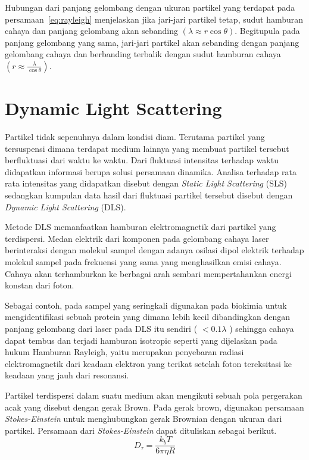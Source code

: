 Hubungan dari panjang gelombang dengan ukuran partikel yang terdapat pada 
persamaan~\ref{eq:rayleigh} menjelaskan jika jari-jari partikel tetap, sudut hamburan
cahaya dan panjang gelombang akan sebanding ${\left(\lambda \approx r \cos \theta \right)}$.
Begitupula pada panjang gelombang yang sama, jari-jari partikel akan sebanding dengan
panjang gelombang cahaya dan berbanding terbalik dengan sudut hamburan cahaya 
${\left(r \approx \frac{\lambda}{\cos \theta} \right)}$.



\section{Dynamic Light Scattering}
Partikel tidak sepenuhnya dalam kondisi diam. Terutama partikel yang tersuspensi dimana terdapat
medium lainnya yang membuat partikel tersebut berfluktuasi dari waktu ke waktu. Dari fluktuasi
intensitas terhadap waktu didapatkan informasi berupa solusi persamaan dinamika. Analisa terhadap
rata rata intensitas yang didapatkan disebut dengan \textit{Static Light Scattering} (SLS) sedangkan
kumpulan data hasil dari fluktuasi partikel tersebut disebut dengan \textit{Dynamic Light Scattering}
(DLS).

Metode DLS memanfaatkan hamburan elektromagnetik dari partikel yang terdispersi. Medan elektrik
dari komponen pada gelombang cahaya laser berinteraksi dengan molekul sampel dengan adanya osilasi
dipol elektrik terhadap molekul sampel pada frekuensi yang sama yang menghasilkan emisi cahaya.
Cahaya akan terhamburkan ke berbagai arah sembari mempertahankan energi konstan dari foton. 

Sebagai contoh, pada sampel yang seringkali digunakan pada biokimia untuk mengidentifikasi sebuah
protein yang dimana lebih kecil dibandingkan dengan panjang gelombang dari laser pada DLS itu
sendiri ( $<0.1\lambda$ ) sehingga cahaya dapat tembus dan terjadi hamburan isotropic seperti yang
dijelaskan pada hukum Hamburan Rayleigh, yaitu merupakan penyebaran radiasi
elektromagnetik dari keadaan elektron yang terikat setelah foton tereksitasi ke keadaan yang jauh
dari resonansi\cite{Piazza2005}.

Partikel terdispersi dalam suatu medium akan mengikuti sebuah pola pergerakan acak yang disebut
dengan gerak Brown. Pada gerak brown, digunakan persamaan \textit{Stokes-Einstein} untuk
menghubungkan gerak Brownian dengan ukuran dari partikel\cite{Anindya2018}. Persamaan dari
\textit{Stokes-Einstein} dapat dituliskan sebagai berikut.
\begin{equation}
    D_{\tau} = \frac{k_b T}{6 \pi \eta R}
    \label{eq:stokeseinstein}
\end{equation}

